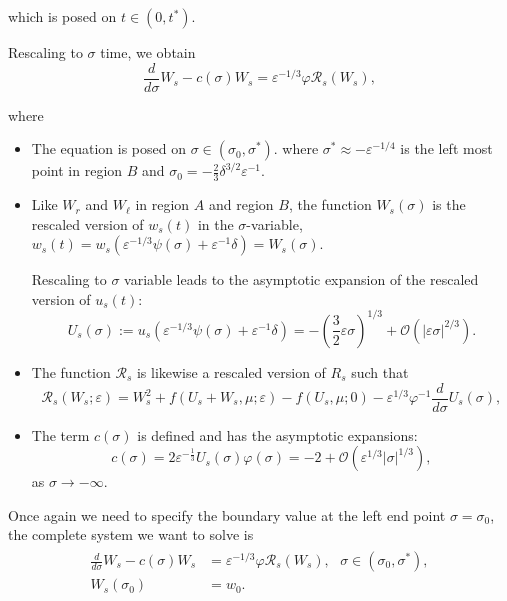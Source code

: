 \documentclass[letterpaper,11pt]{article}
\newcommand{\Ral}{\mathcal{R}}
\newcommand{\rmO}{\mathcal{O}}
\newcommand{\eps}{\varepsilon}
\numberwithin{equation}{section}
\theoremstyle{plain}
\begin{document}
which is posed on $t\in (0, t^*)$.

Rescaling to $\sigma$ time, we obtain
\begin{equation}
\frac{d}{d\sigma} W_s - c(\sigma)W_s = \eps^{-1/3}\varphi \Ral_s(W_s),
\end{equation}


where 
\begin{itemize}
\item The equation is posed on $\sigma \in \left(\sigma_0, \sigma^*\right).$ where $\sigma^* \approx -\eps^{-1/4}$ is the left most point in region $B$ and $\sigma_0  =-\frac{2}{3}\delta^{3/2}\eps^{-1}$.

\item 
Like $W_r$ and $W_\ell$ in region $A$ and region $B$, the function $W_s(\sigma)$ is the rescaled version of $w_s(t)$ in the $\sigma$-variable, $w_s(t) = w_s(\eps^{-1/3}\psi(\sigma)+\eps^{-1}\delta) = W_s(\sigma)$. 

Rescaling to $\sigma$ variable leads to the asymptotic expansion of the rescaled version of $u_s(t)$:
\begin{equation}\label{sing_exp}
U_s(\sigma) :=u_s(\eps^{-1/3}\psi(\sigma)+\eps^{-1}\delta)= -\left(\frac{3}{2}\eps \sigma\right)^{1/3} + \rmO(|\eps \sigma|^{2/3} ).
\end{equation}

\item The function $\Ral_s$ is likewise a rescaled version of $R_s$ such that 
\[
\Ral_s(W_s;\eps) = W_s^2+ f(U_s+W_s, \mu ; \eps)-f(U_s,\mu;0)- \eps^{1/3}\varphi^{-1} \frac{d}{d\sigma}U_s(\sigma),
\] 


\item The term $c(\sigma)$ is defined and has the asymptotic expansions:
\[
c(\sigma) = 2\eps^{-\frac{1}{3}}U_s(\sigma)\varphi(\sigma) = -2 + \rmO(\eps^{1/3}|\sigma|^{1/3}),
\]
as $\sigma \to -\infty$.


\end{itemize}
 
Once again we need to specify the boundary value at the left end point $\sigma = \sigma_0$, the complete system we want to solve is
\begin{align}\label{ws_bp}
\begin{split}
\frac{d}{d\sigma} W_s - c(\sigma)W_s &= \eps^{-1/3}\varphi \Ral_s(W_s), \text{ }\sigma \in (\sigma_0,\sigma^*),\\
W_s(\sigma_0) &= w_0.
\end{split}
\end{align}
\end{document}
